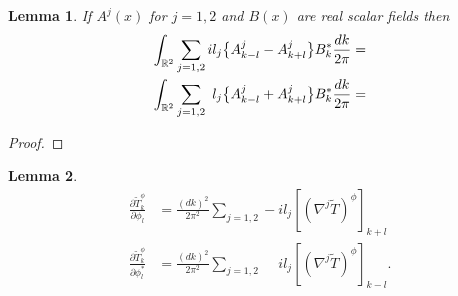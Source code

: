 \documentclass[noinfoline]{imsart}
\newtheorem{lemma}{Lemma}
\begin{document}
\begin{lemma} If $A^j(x)$ for $j=1,2$ and $B(x)$ are real scalar fields then
\begin{align}
 \int_{\Bbb R^2} \sum_{j=1,2} il_j\bigl\{ A^j_{k-l}  -   A^j_{k+l}  \bigr\} B^*_k \frac{dk}{2\pi}  &= \\
  \int_{\Bbb R^2} \sum_{j=1,2} \phantom{i}l_j\bigl\{  A^j_{k-l}  +    A^j_{k+l}   \bigr\} B^*_k \frac{dk}{2\pi} &= 
\end{align}
\end{lemma}


\begin{proof}
\end{proof}


\begin{lemma} 
\label{partialconj}
\begin{align}
\frac{\partial \widetilde T^\phi_k}{\partial \phi_{ l} }  &= \frac{  (dk)^2}{2\pi^2}\sum_{j=1,2} -il_j[(\nabla^j\widetilde T)^\phi]_{k+l} \\
\frac{\partial \widetilde T^\phi_k}{\partial \phi^*_{ l} }  & = \frac{ (dk)^2}{2\pi^2}\sum_{j=1,2} \phantom{-}\!\!il_j [(\nabla^j\widetilde T)^\phi]_{k-l}.
\end{align}
\end{lemma}
\end{document}
